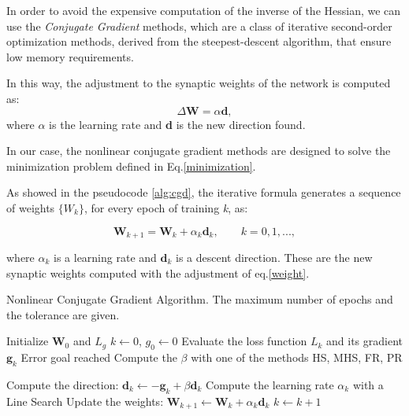 		In order to avoid the expensive computation of the inverse of the Hessian, we can use the \textit{Conjugate Gradient} methods, which are a class of iterative second-order optimization methods, derived from the steepest-descent algorithm, that ensure low memory requirements.

		In this way, the adjustment to the synaptic weights of the network is computed as:
		 \begin{equation}
		 	\label{weight}
		    \Delta\textbf{W} = \alpha\textbf{d},
		 \end{equation}
		where $\alpha$ is the learning rate and \textbf{d} is the new direction found.

		In our case, the nonlinear conjugate gradient methods are designed to solve the minimization problem defined in Eq.\ref{minimization}.

		As showed in the pseudocode \ref{alg:cgd}, the iterative formula generates a sequence of weights $\{W_k\}$, for every epoch of training \textit{k}, as:

		\begin{equation}
			\textbf{W}_{k+1} = \textbf{W}_{k} + \alpha_k\textbf{d}_k, \text{  }\text{  }\text{  } \textit{k} = 0,1,...,
		\end{equation}

		where $\alpha_k$ is a learning rate and $\textbf{d}_k$ is a descent direction. These are the new synaptic weights computed with the adjustment of eq.\ref{weight}.

		
		\begin{algorithm}[H]
			\caption{Nonlinear Conjugate Gradient Algorithm. The maximum number of epochs and the tolerance are given.}
			\label{alg:cgd}
			\begin{algorithmic}[1]
					\State Initialize $\textbf{W}_0$ and $\textit{L}_g$
					\State $k \gets 0$, $g_0 \gets 0$
						\State Evaluate the loss function $\textit{L}_k$ and its gradient $\textbf{g}_k$ 
							\State
							\Return Error goal reached
						\EndIf
						\State Compute the $\beta$ with one of the methods HS, MHS, FR, PR

						\State Compute the direction: $\textbf{d}_k \gets - \textbf{g}_k + \beta\textbf{d}_k$
						\State Compute the learning rate $\alpha_k$ with a Line Search 
						\State Update the weights: $\textbf{W}_{k+1} \gets \textbf{W}_{k} + \alpha_k\textbf{d}_k$
						\State $k \gets k + 1$
					\EndWhile
				\EndProcedure
			\end{algorithmic}
		\end{algorithm}


